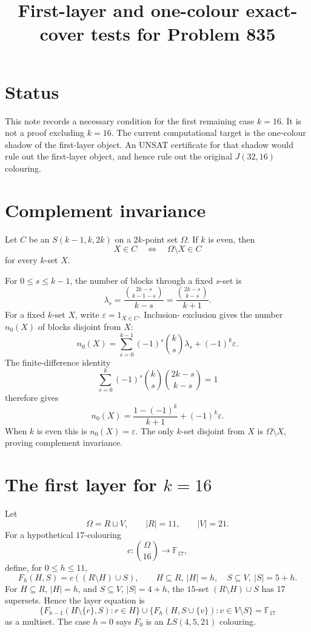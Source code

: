 \documentclass[11pt]{article}
\title{First-layer and one-colour exact-cover tests for Problem 835}
\author{}
\date{}
\newcommand{\F}{\mathbb F_{17}}
\begin{document}
\maketitle

\section*{Status}

This note records a necessary condition for the first remaining case \(k=16\).
It is not a proof excluding \(k=16\).  The current computational target is the
one-colour shadow of the first-layer object.  An UNSAT certificate for that
shadow would rule out the first-layer object, and hence rule out the original
\(J(32,16)\) colouring.

\section*{Complement invariance}

Let \(C\) be an \(S(k-1,k,2k)\) on a \(2k\)-point set \(\Omega\).  If \(k\) is
even, then
\[
  X\in C\quad\Longleftrightarrow\quad \Omega\setminus X\in C
\]
for every \(k\)-set \(X\).

For \(0\le s\le k-1\), the number of blocks through a fixed \(s\)-set is
\[
  \lambda_s
  =
  \frac{\binom{2k-s}{k-1-s}}{k-s}
  =
  \frac{\binom{2k-s}{k-s}}{k+1}.
\]
For a fixed \(k\)-set \(X\), write \(\varepsilon=1_{X\in C}\).  Inclusion-
exclusion gives the number \(n_0(X)\) of blocks disjoint from \(X\):
\[
  n_0(X)
  =
  \sum_{s=0}^{k-1}(-1)^s\binom{k}{s}\lambda_s
  +(-1)^k\varepsilon.
\]
The finite-difference identity
\[
  \sum_{s=0}^{k}(-1)^s\binom{k}{s}\binom{2k-s}{k-s}=1
\]
therefore gives
\[
  n_0(X)=\frac{1-(-1)^k}{k+1}+(-1)^k\varepsilon.
\]
When \(k\) is even this is \(n_0(X)=\varepsilon\).  The only \(k\)-set disjoint
from \(X\) is \(\Omega\setminus X\), proving complement invariance.

\section*{The first layer for \(k=16\)}

Let
\[
  \Omega=R\sqcup V,\qquad |R|=11,\qquad |V|=21.
\]
For a hypothetical \(17\)-colouring
\[
  c:\binom{\Omega}{16}\to\F,
\]
define, for \(0\le h\le 11\),
\[
  F_h(H,S)=c((R\setminus H)\cup S),
  \qquad
  H\subseteq R,\ |H|=h,\quad S\subseteq V,\ |S|=5+h.
\]
For \(H\subseteq R\), \(|H|=h\), and \(S\subseteq V\), \(|S|=4+h\), the
\(15\)-set \((R\setminus H)\cup S\) has 17 supersets.  Hence the layer equation
is
\[
  \{F_{h-1}(H\setminus\{r\},S):r\in H\}
  \cup
  \{F_h(H,S\cup\{v\}):v\in V\setminus S\}
  =
  \F
\]
as a multiset.  The case \(h=0\) says \(F_0\) is an \(LS(4,5,21)\) colouring.
\end{document}
